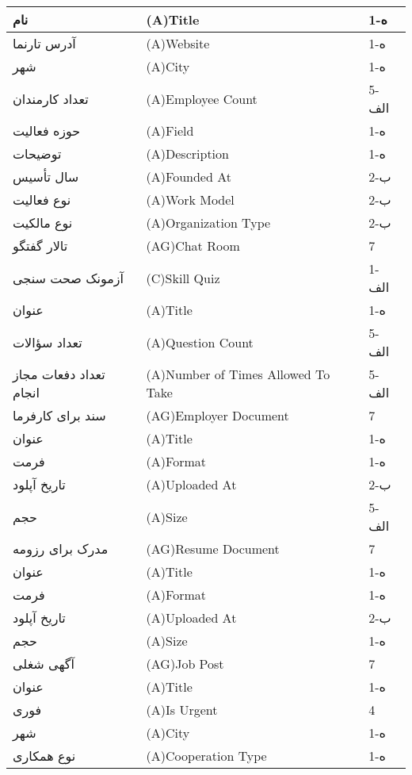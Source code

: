 \documentclass[12pt]{article}
\begin{document}
\begin{center}
\begin{table}[]
\begin{tabular}{|l|l|l|}
				\hline
				نام & (A)Title & 1-ه   \\
				\hline
				آدرس تارنما & (A)Website & 1-ه   \\
				\hline
				شهر & (A)City & 1-ه   \\
				\hline
				تعداد کارمندان & (A)Employee Count & 5-الف \\
				\hline
				حوزه فعالیت & (A)Field & 1-ه   \\
				\hline
				توضیحات & (A)Description & 1-ه   \\
				\hline
				سال تأسیس & (A)Founded At & 2-ب   \\
				\hline
				نوع فعالیت & (A)Work Model & 2-ب   \\
				\hline
				نوع مالکیت & (A)Organization Type & 2-ب   \\
				\hline
				تالار گفتگو & (AG)Chat Room & 7     \\
				\hline
				آزمونک صحت سنجی & (C)Skill Quiz & 1-الف \\
				\hline
				عنوان & (A)Title & 1-ه   \\
				\hline
				تعداد سؤالات & (A)Question Count & 5-الف \\
				\hline
				تعداد دفعات مجاز انجام & (A)Number of Times Allowed To Take & 5-الف \\
				\hline
				سند برای کارفرما & (AG)Employer Document & 7     \\
				\hline
				عنوان & (A)Title & 1-ه   \\
				\hline
				فرمت & (A)Format & 1-ه   \\
				\hline
				تاریخ آپلود & (A)Uploaded At & 2-ب   \\
				\hline
				حجم & (A)Size & 5-الف \\
				\hline
				مدرک برای رزومه & (AG)Resume Document & 7     \\
				\hline
				عنوان & (A)Title & 1-ه   \\
				\hline
				فرمت & (A)Format & 1-ه   \\
				\hline
				تاریخ آپلود & (A)Uploaded At & 2-ب   \\
				\hline
				حجم & (A)Size & 1-ه   \\
				\hline
				آگهی شغلی & (AG)Job Post & 7     \\
				\hline
				عنوان & (A)Title & 1-ه   \\
				\hline
				فوری & (A)Is Urgent & 4     \\
				\hline
				شهر & (A)City & 1-ه   \\
				\hline
				نوع همکاری & (A)Cooperation Type & 1-ه   \\

\end{tabular}
\end{table}
\end{center}
\end{document}

